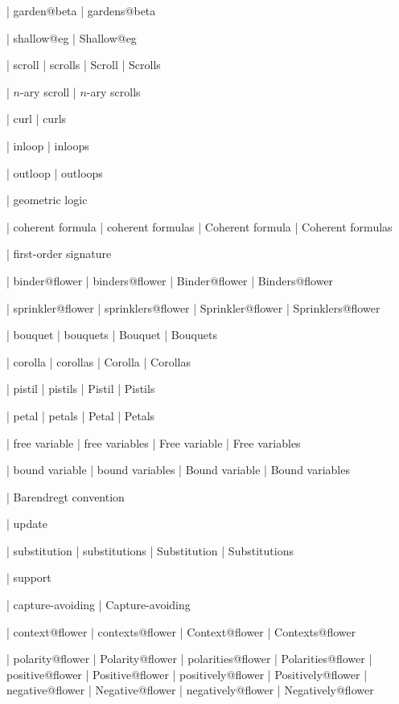  | garden@beta
 | gardens@beta

 | shallow@eg
 | Shallow@eg


 | scroll
 | scrolls
 | Scroll
 | Scrolls

 | $n$-ary scroll
 | $n$-ary scrolls

 | curl
 | curls

 | inloop
 | inloops

 | outloop
 | outloops

 | geometric logic

 | coherent formula
 | coherent formulas
 | Coherent formula
 | Coherent formulas

 | first-order signature

 | binder@flower
 | binders@flower
 | Binder@flower
 | Binders@flower

 | sprinkler@flower
 | sprinklers@flower
 | Sprinkler@flower
 | Sprinklers@flower

 | bouquet
 | bouquets
 | Bouquet
 | Bouquets

 | corolla
 | corollas
 | Corolla
 | Corollas

 | pistil
 | pistils
 | Pistil
 | Pistils

 | petal
 | petals
 | Petal
 | Petals

 | free variable
 | free variables
 | Free variable
 | Free variables

 | bound variable
 | bound variables
 | Bound variable
 | Bound variables

 | Barendregt convention

 | update

 | substitution
 | substitutions
 | Substitution
 | Substitutions

 | support

 | capture-avoiding
 | Capture-avoiding

 | context@flower
 | contexts@flower
 | Context@flower
 | Contexts@flower

 | polarity@flower
 | Polarity@flower
 | polarities@flower
 | Polarities@flower
 | positive@flower
 | Positive@flower
 | positively@flower
 | Positively@flower
 | negative@flower
 | Negative@flower
 | negatively@flower
 | Negatively@flower

